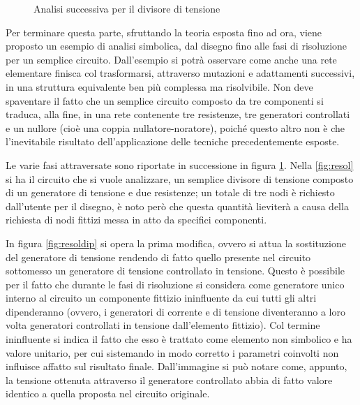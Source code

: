 \begin{figure}
 \caption{Analisi successiva per il divisore di tensione}
 \label{fig:resolall}
\end{figure}

Per terminare questa parte, sfruttando la teoria esposta fino ad ora, viene proposto un esempio di analisi simbolica, dal disegno fino alle fasi di risoluzione per un semplice circuito. Dall'esempio si potrà osservare come anche una rete elementare finisca col trasformarsi, attraverso mutazioni e adattamenti successivi, in una struttura equivalente ben più complessa ma risolvibile. Non deve spaventare il fatto che un semplice circuito composto da tre componenti si traduca, alla fine, in una rete contenente tre resistenze, tre generatori controllati e un nullore (cioè una coppia nullatore-noratore), poiché questo altro non è che l'inevitabile risultato dell'applicazione delle tecniche precedentemente esposte.

Le varie fasi attraversate sono riportate in successione in figura \ref{fig:resolall}. Nella \ref{fig:resol} si ha il circuito che si vuole analizzare, un semplice divisore di tensione composto di un generatore di tensione e due resistenze; un totale di tre nodi è richiesto dall'utente per il disegno, è noto però che questa quantità lieviterà a causa della richiesta di nodi fittizi messa in atto da specifici componenti.

In figura \ref{fig:resoldip} si opera la prima modifica, ovvero si attua la sostituzione del generatore di tensione rendendo di fatto quello presente nel circuito sottomesso un generatore di tensione controllato in tensione. Questo è possibile per il fatto che durante le fasi di risoluzione si considera come generatore unico interno al circuito un componente fittizio ininfluente da cui tutti gli altri dipenderanno (ovvero, i generatori di corrente e di tensione diventeranno a loro volta generatori controllati in tensione dall'elemento fittizio). Col termine ininfluente si indica il fatto che esso è trattato come elemento non simbolico e ha valore unitario, per cui sistemando in modo corretto i parametri coinvolti non influisce affatto sul risultato finale. Dall'immagine si può notare come, appunto, la tensione ottenuta attraverso il generatore controllato abbia di fatto valore identico a quella proposta nel circuito originale.

